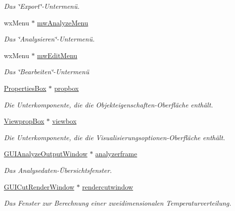 \begin{DoxyCompactItemize}
\begin{DoxyCompactList}\small\item\em Das \char`\"{}\-Export\char`\"{}-\/\-Untermenü. \end{DoxyCompactList}\item 
wx\-Menu $\ast$ \hyperlink{classGUIMainWindow_ab93a87b5cde10015dc02dc000c409f90}{mw\-Analyze\-Menu}
\begin{DoxyCompactList}\small\item\em Das \char`\"{}\-Analysieren\char`\"{}-\/\-Untermenü. \end{DoxyCompactList}\item 
wx\-Menu $\ast$ \hyperlink{classGUIMainWindow_a32c50be8574176c02aadb47626adc9d4}{mw\-Edit\-Menu}
\begin{DoxyCompactList}\small\item\em Das \char`\"{}\-Bearbeiten\char`\"{}-\/\-Untermenü \end{DoxyCompactList}\item 
\hyperlink{classPropertiesBox}{Properties\-Box} $\ast$ \hyperlink{classGUIMainWindow_a4959774563543927a492bf06e441920e}{propbox}
\begin{DoxyCompactList}\small\item\em Die Unterkomponente, die die Objekteigenschaften-\/\-Oberfläche enthält. \end{DoxyCompactList}\item 
\hyperlink{classViewpropBox}{Viewprop\-Box} $\ast$ \hyperlink{classGUIMainWindow_a3e9a4e301f90e85e97721aa71b197ca8}{viewbox}
\begin{DoxyCompactList}\small\item\em Die Unterkomponente, die die Visualisierungsoptionen-\/\-Oberfläche enthält. \end{DoxyCompactList}\item 
\hyperlink{classGUIAnalyzeOutputWindow}{G\-U\-I\-Analyze\-Output\-Window} $\ast$ \hyperlink{classGUIMainWindow_a20e7a8cf498df1c1c0059711b487837b}{analyzerframe}
\begin{DoxyCompactList}\small\item\em Das Analysedaten-\/Übersichtsfenster. \end{DoxyCompactList}\item 
\hyperlink{classGUICutRenderWindow}{G\-U\-I\-Cut\-Render\-Window} $\ast$ \hyperlink{classGUIMainWindow_a649cb92f27688772174659601188ac2d}{rendercutwindow}
\begin{DoxyCompactList}\small\item\em Das Fenster zur Berechnung einer zweidimensionalen Temperaturverteilung. \end{DoxyCompactList}\item 

\end{DoxyCompactItemize}
